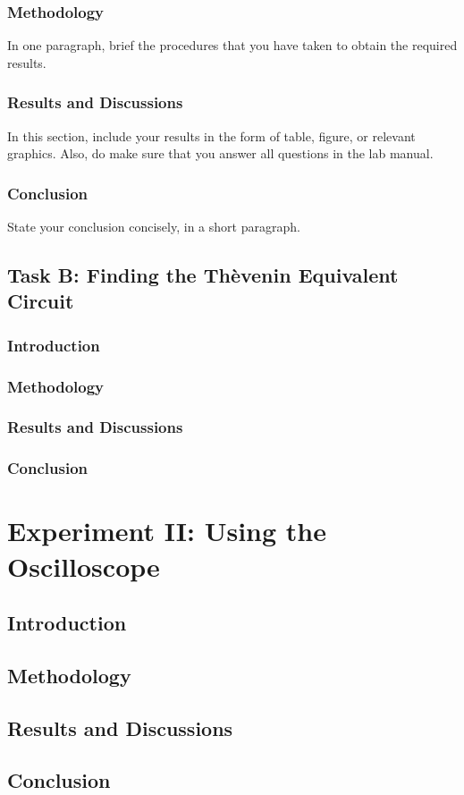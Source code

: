 \documentclass[11pt]{article}
\begin{document}
\subsubsection{Methodology}
In one paragraph, brief the procedures that you have taken to obtain the required results. 

\subsubsection{Results and Discussions}
In this section, include your results in the form of table, figure, or relevant graphics.  Also, do make sure that you answer all questions in the lab manual. 

\subsubsection{Conclusion}
State your conclusion concisely, in a short paragraph.

\subsection{Task B: Finding the Th\`{e}venin Equivalent Circuit}
\subsubsection{Introduction}

\subsubsection{Methodology}

\subsubsection{Results and Discussions}

\subsubsection{Conclusion}


\newpage

\section{Experiment II: Using the Oscilloscope}

\subsection{Introduction}

\subsection{Methodology}

\subsection{Results and Discussions}

\subsection{Conclusion}
\end{document}
